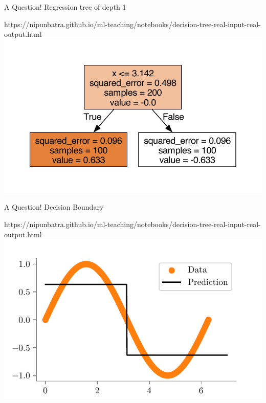 \documentclass[usenames,dvipsnames]{beamer}
\begin{document}
\begin{frame}{A Question!}
Regression tree of depth 1
\begin{center}
	\begin{notebookbox}{https://nipunbatra.github.io/ml-teaching/notebooks/decision-tree-real-input-real-output.html}
		\includegraphics[scale=0.6]{../assets/decision-trees/figures/sine-depth-1-sklearn.pdf}
	  \end{notebookbox}
\end{center}
\end{frame}

\begin{frame}{A Question!}
Decision Boundary
\begin{center}
	\begin{notebookbox}{https://nipunbatra.github.io/ml-teaching/notebooks/decision-tree-real-input-real-output.html}
		\includegraphics{../assets/decision-trees/figures/sine-depth-1.pdf}
	  \end{notebookbox}
\end{center}
\end{frame}
\end{document}
